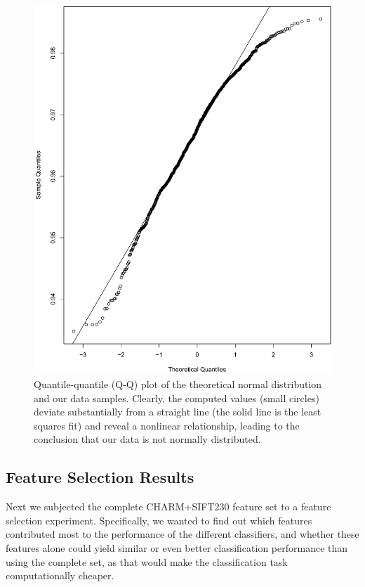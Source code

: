 \begin{figure}
	\centering
	\includegraphics[width=\columnwidth]{fig09}
	\caption{\color{red}Quantile-quantile (Q-Q) plot of the theoretical normal distribution and our data samples. Clearly, the computed values (small circles) deviate substantially from a straight line (the solid line is the least squares fit) and reveal a nonlinear relationship, leading to the conclusion that our data is not normally distributed.}
	\label{fig:normalityPlot}
\end{figure}

\subsection{Feature Selection Results}
\label{subsec:featureSelectionResults}

Next we subjected the complete CHARM+SIFT230 feature set to a feature selection experiment. Specifically, we wanted to find out which features contributed most to the performance of the different classifiers, and whether these features alone could yield similar or even better classification performance than using the complete set, as that would make the classification task computationally cheaper.

